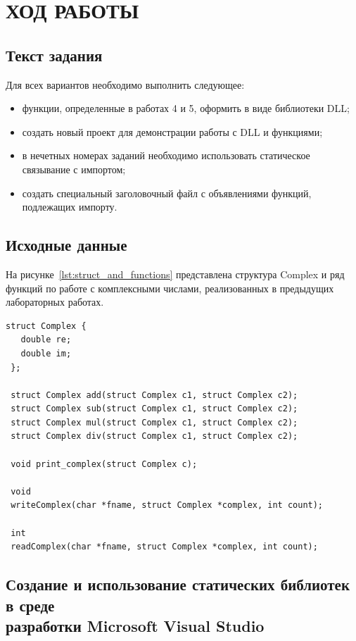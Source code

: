 \section{ХОД РАБОТЫ}

\subsection{Текст задания}

Для всех вариантов необходимо выполнить следующее:

\begin{itemize}
\item
  функции, определенные в работах 4 и 5, оформить в виде библиотеки DLL;
\item
  создать новый проект для демонстрации работы с DLL и функциями;
\item
  в нечетных номерах заданий необходимо использовать
  статическое связывание с импортом; 
\item
  создать специальный заголовочный файл с объявлениями функций,
  подлежащих импорту.
\end{itemize}

\subsection{Исходные данные}

На рисунке~\ref{lst:struct_and_functions} представлена структура Complex
и ряд функций по работе с комплексными числами,
реализованных в предыдущих лабораторных работах.

\begin{lstlisting}[caption=Структура Complex
  и прототипы функций для работы с ней,
  label=lst:struct_and_functions]
 struct Complex {
   double re;
   double im;
 };
 
 struct Complex add(struct Complex c1, struct Complex c2);
 struct Complex sub(struct Complex c1, struct Complex c2);
 struct Complex mul(struct Complex c1, struct Complex c2);
 struct Complex div(struct Complex c1, struct Complex c2);
 
 void print_complex(struct Complex c);
 
 void
 writeComplex(char *fname, struct Complex *complex, int count);

 int
 readComplex(char *fname, struct Complex *complex, int count);
\end{lstlisting}

\subsection{Создание и использование статических библиотек
  в среде \\ разработки Microsoft Visual Studio}

